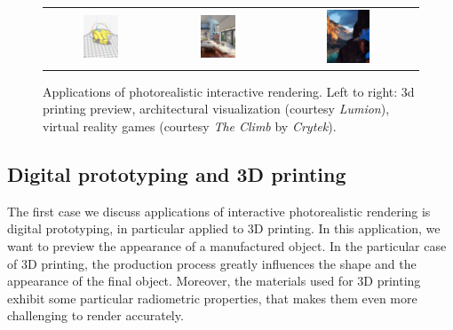 \begin{figure}
\centering
\begin{tabular}{@{}c@{}c@{}c@{}}
	 \includegraphics[width=0.33\textwidth]{figures/3dprinting_preview_crop} & 	 \includegraphics[width=0.33\textwidth]{figures/lumion-crop.jpg} 
& 	 \includegraphics[width=0.33\textwidth]{figures/the-climb-crop.jpg} \\
\end{tabular}
\caption{Applications of photorealistic interactive rendering. Left to right: 3d printing preview, architectural visualization (courtesy \emph{Lumion}), virtual reality games (courtesy \emph{The Climb} by \emph{Crytek}).} 
\label{fig:applications}
\end{figure}

\subsection{Digital prototyping and 3D printing}
The first case we discuss applications of interactive photorealistic rendering is digital prototyping, in particular applied to 3D printing. In this application, we want to preview the appearance of a manufactured object. In the particular case of 3D printing, the production process greatly influences the shape and the appearance of the final object. Moreover, the materials used for 3D printing exhibit some particular radiometric properties, that makes them even more challenging to render accurately. 

